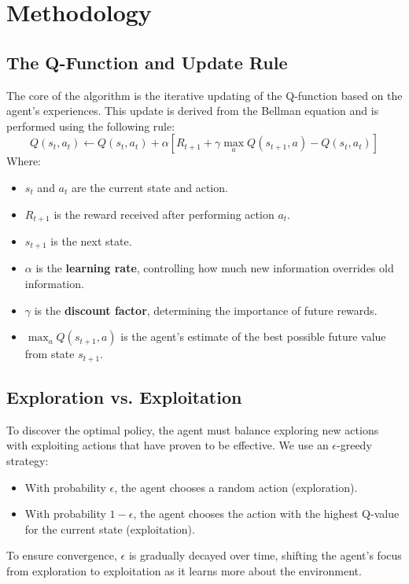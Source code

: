 \documentclass{article}
\begin{document}
\section{Methodology}

\subsection{The Q-Function and Update Rule}
The core of the algorithm is the iterative updating of the Q-function based on the agent's experiences. This update is derived from the Bellman equation and is performed using the following rule:
$$
Q(s_t, a_t) \leftarrow Q(s_t, a_t) + \alpha \left[ R_{t+1} + \gamma \max_{a} Q(s_{t+1}, a) - Q(s_t, a_t) \right]
$$
Where:
\begin{itemize}
    \item $s_t$ and $a_t$ are the current state and action.
    \item $R_{t+1}$ is the reward received after performing action $a_t$.
    \item $s_{t+1}$ is the next state.
    \item $\alpha$ is the \textbf{learning rate}, controlling how much new information overrides old information.
    \item $\gamma$ is the \textbf{discount factor}, determining the importance of future rewards.
    \item $\max_{a} Q(s_{t+1}, a)$ is the agent's estimate of the best possible future value from state $s_{t+1}$.
\end{itemize}

\subsection{Exploration vs. Exploitation}
To discover the optimal policy, the agent must balance exploring new actions with exploiting actions that have proven to be effective. We use an $\epsilon$-greedy strategy:
\begin{itemize}
    \item With probability $\epsilon$, the agent chooses a random action (exploration).
    \item With probability $1-\epsilon$, the agent chooses the action with the highest Q-value for the current state (exploitation).
\end{itemize}
To ensure convergence, $\epsilon$ is gradually decayed over time, shifting the agent's focus from exploration to exploitation as it learns more about the environment.
\end{document}
